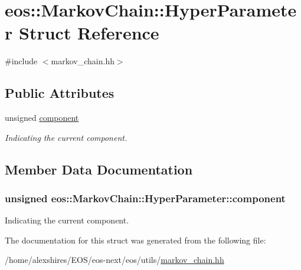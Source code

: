 \hypertarget{structeos_1_1MarkovChain_1_1HyperParameter}{
\section{eos::MarkovChain::HyperParameter Struct Reference}
\label{structeos_1_1MarkovChain_1_1HyperParameter}
}


{\ttfamily \#include $<$markov\_\-chain.hh$>$}\subsection*{Public Attributes}
\begin{DoxyCompactItemize}
\item 
unsigned \hyperlink{structeos_1_1MarkovChain_1_1HyperParameter_a775ee43b8fb689d149cd2190c994c8a9}{component}
\begin{DoxyCompactList}\small\item\em Indicating the current component. \item\end{DoxyCompactList}\end{DoxyCompactItemize}


\subsection{Member Data Documentation}
\hypertarget{structeos_1_1MarkovChain_1_1HyperParameter_a775ee43b8fb689d149cd2190c994c8a9}{
\subsubsection[{component}]{\setlength{\rightskip}{0pt plus 5cm}unsigned {\bf eos::MarkovChain::HyperParameter::component}}}
\label{structeos_1_1MarkovChain_1_1HyperParameter_a775ee43b8fb689d149cd2190c994c8a9}


Indicating the current component. 

The documentation for this struct was generated from the following file:\begin{DoxyCompactItemize}
\item 
/home/alexshires/EOS/eos-\/next/eos/utils/\hyperlink{markov__chain_8hh}{markov\_\-chain.hh}\end{DoxyCompactItemize}
